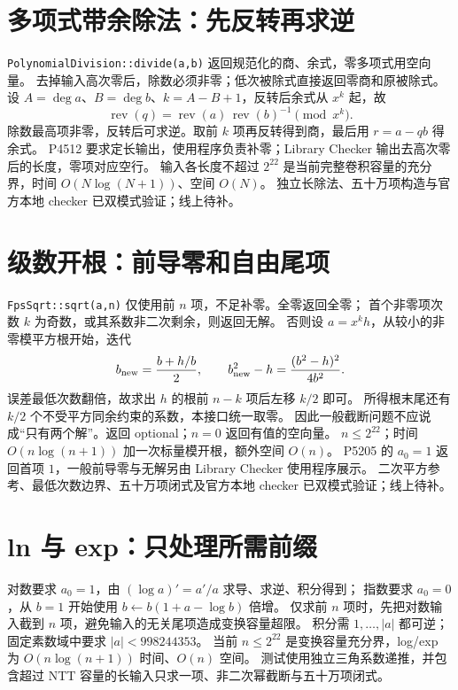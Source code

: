 \section{多项式带余除法：先反转再求逆}\label{knowledge-poly-division}
\texttt{PolynomialDivision::divide(a,b)} 返回规范化的商、余式，零多项式用空向量。
去掉输入高次零后，除数必须非零；低次被除式直接返回零商和原被除式。
设 $A=\deg a$、$B=\deg b$、$k=A-B+1$，反转后余式从 $x^k$ 起，故
\[
 \operatorname{rev}(q)=\operatorname{rev}(a)\,
 \operatorname{rev}(b)^{-1}\pmod{x^k}.
\]
除数最高项非零，反转后可求逆。取前 $k$ 项再反转得到商，最后用 $r=a-qb$ 得余式。
P4512 要求定长输出，使用程序负责补零；Library Checker 输出去高次零后的长度，零项对应空行。
输入各长度不超过 $2^{22}$ 是当前完整卷积容量的充分界，时间 $O(N\log(N+1))$、空间 $O(N)$。
独立长除法、五十万项构造与官方本地 checker 已双模式验证；线上待补。
\section{级数开根：前导零和自由尾项}\label{knowledge-poly-sqrt}
\texttt{FpsSqrt::sqrt(a,n)} 仅使用前 $n$ 项，不足补零。全零返回全零；
首个非零项次数 $k$ 为奇数，或其系数非二次剩余，则返回无解。
否则设 $a=x^kh$，从较小的非零模平方根开始，迭代
\[
 b_{\rm new}=\frac{b+h/b}{2},\qquad
 b_{\rm new}^2-h=\frac{(b^2-h)^2}{4b^2}.
\]
误差最低次数翻倍，故求出 $h$ 的根前 $n-k$ 项后左移 $k/2$ 即可。
所得根末尾还有 $k/2$ 个不受平方同余约束的系数，本接口统一取零。
因此一般截断问题不应说成“只有两个解”。返回 optional；$n=0$ 返回有值的空向量。
$n\le 2^{22}$；时间 $O(n\log(n+1))$ 加一次标量模开根，额外空间 $O(n)$。
P5205 的 $a_0=1$ 返回首项 $1$，一般前导零与无解另由 Library Checker 使用程序展示。
二次平方参考、最低次数边界、五十万项闭式及官方本地 checker 已双模式验证；线上待补。
\section{ln 与 exp：只处理所需前缀}\label{knowledge-poly-ln-exp}
对数要求 $a_0=1$，由 $(\log a)'=a'/a$ 求导、求逆、积分得到；
指数要求 $a_0=0$，从 $b=1$ 开始使用 $b\gets b(1+a-\log b)$ 倍增。
仅求前 $n$ 项时，先把对数输入截到 $n$ 项，避免输入的无关尾项造成变换容量超限。
积分需 $1,\ldots,|a|$ 都可逆；固定素数域中要求 $|a|<998244353$。
当前 $n\le 2^{22}$ 是变换容量充分界，log/exp 为 $O(n\log(n+1))$ 时间、$O(n)$ 空间。
测试使用独立三角系数递推，并包含超过 NTT 容量的长输入只求一项、非二次幂截断与五十万项闭式。

